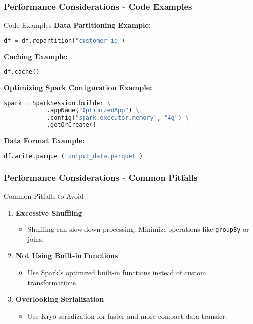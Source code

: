 \documentclass[aspectratio=169]{beamer}
\begin{document}
\begin{frame}[fragile]
    \frametitle{Performance Considerations - Code Examples}
    \begin{block}{Code Examples}
        \textbf{Data Partitioning Example:}
        \begin{lstlisting}[language=Python]
        df = df.repartition("customer_id")
        \end{lstlisting}

        \textbf{Caching Example:}
        \begin{lstlisting}[language=Python]
        df.cache()
        \end{lstlisting}

        \textbf{Optimizing Spark Configuration Example:}
        \begin{lstlisting}[language=Python]
        spark = SparkSession.builder \
            .appName("OptimizedApp") \
            .config("spark.executor.memory", "4g") \
            .getOrCreate()
        \end{lstlisting}

        \textbf{Data Format Example:}
        \begin{lstlisting}[language=Python]
        df.write.parquet("output_data.parquet")
        \end{lstlisting}
    \end{block}
\end{frame}

\begin{frame}[fragile]
    \frametitle{Performance Considerations - Common Pitfalls}
    \begin{block}{Common Pitfalls to Avoid}
        \begin{enumerate}
            \item \textbf{Excessive Shuffling}
            \begin{itemize}
                \item Shuffling can slow down processing. Minimize operations like \texttt{groupBy} or joins.
            \end{itemize}
            \item \textbf{Not Using Built-in Functions}
            \begin{itemize}
                \item Use Spark's optimized built-in functions instead of custom transformations.
            \end{itemize}
            \item \textbf{Overlooking Serialization}
            \begin{itemize}
                \item Use Kryo serialization for faster and more compact data transfer.
            \end{itemize}
        \end{enumerate}
    \end{block}
\end{frame}
\end{document}
